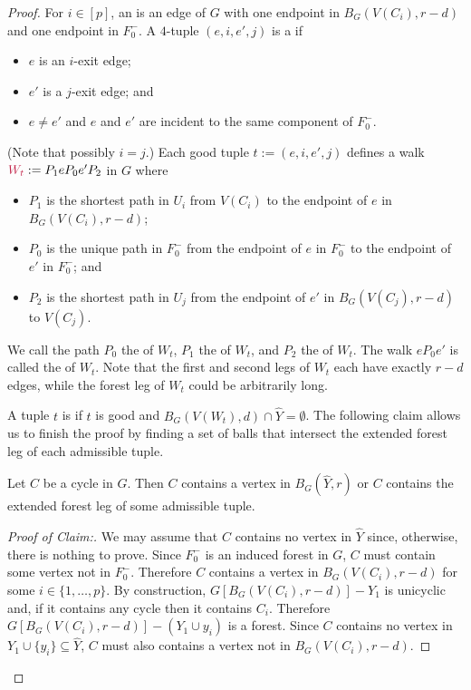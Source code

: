 \documentclass{patmorin}
\newcommand{\pat}[1]{\textcolor{Blue}{[Pat: #1]}}
\newcommand{\gwen}[1]{\textcolor{Purple}{Gwen: #1}}
\newcommand{\piotr}[1]{\textcolor{red}{Piotr: #1}}
\newenvironment{clmproof}{\begin{proof}[Proof of Claim:]\renewcommand{\qedsymbol}{\rule{1ex}{1ex}}}{\end{proof}}
\begin{document}
\begin{proof}
For $i\in[p]$, an  is an edge of $G$ with one endpoint in $B_G(V(C_i),r-d)$ and one endpoint in $F_0^-$.
A $4$-tuple $(e,i,e',j)$ is a  if
\begin{itemize}[noitemsep,nosep]
  \item $e$ is an $i$-exit edge;
  \item $e'$ is a $j$-exit edge;
  and \item $e\neq e'$ and $e$ and $e'$ are incident to the same component of $F_0^-$.
\end{itemize}
(Note that possibly $i=j$.)
Each good tuple $t:=(e,i,e',j)$  defines a walk $\mathdefin{W_t}:=P_1eP_0e'P_2$ in $G$ where
\begin{itemize}[noitemsep,nosep]
  \item $P_1$ is the shortest path in $U_i$ from $V(C_i)$ to the endpoint of $e$ in $B_G(V(C_i),r-d)$;
  \item $P_0$ is the unique path in $F_0^-$ from the endpoint of $e$ in $F^-_0$ to the endpoint of $e'$ in $F^-_0$; and
  \item $P_2$ is the shortest path in $U_j$ from the endpoint of $e'$ in $B_G(V(C_j),r-d)$ to $V(C_j)$.
\end{itemize}
We call the path $P_0$ the  of $W_t$, $P_1$ the  of $W_t$, and $P_2$ the  of $W_t$.  The walk $eP_0e'$ is called the  of $W_t$.  Note that the first and second legs of $W_t$ each have exactly $r-d$ edges, while the forest leg of $W_t$ could be arbitrarily long.

A tuple $t$ is  if $t$ is good and $B_G(V(W_t),d) \cap \widehat{Y} = \emptyset$.  The following claim
allows us to finish the proof by finding a set of balls that intersect the extended forest leg of each admissible tuple.

\begin{clm}\label{hit_cycle}
  Let $C$ be a cycle in $G$.  Then  $C$ contains a vertex in $B_G(\widehat{Y},r)$ or $C$ contains the extended forest leg of some admissible tuple.
\end{clm}

\begin{clmproof}
  We may assume that $C$ contains no vertex in $\widehat{Y}$ since, otherwise, there is nothing to prove.
  Since $F_0^-$ is an induced forest in $G$, $C$ must contain some vertex not in $F_0^-$.  Therefore $C$ contains a vertex in $B_G(V(C_i),r-d)$  for some $i\in\{1,\ldots,p\}$. By construction, $G[B_G(V(C_i),r-d)]-Y_1$ is unicyclic and, if it contains any cycle then it contains $C_i$.  Therefore  $G[B_G(V(C_i),r-d)]-(Y_1\cup y_i)$ is a forest.  Since $C$ contains no vertex in $Y_1\cup\{y_i\}\subseteq \widehat{Y}$, $C$ must also contains a vertex not in $B_G(V(C_i),r-d)$.


\end{clmproof}
\end{proof}
\end{document}
